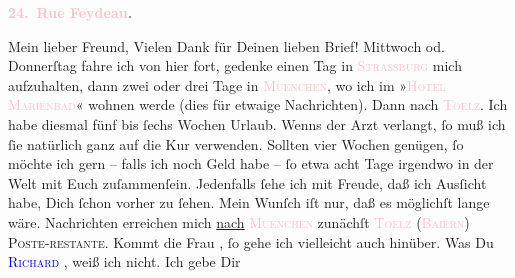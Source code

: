            \pstart
           \begin{otherlanguage}{french}\textcolor{gray}{\textbf{\textbf{\textcolor{pink}{24. Rue Feydeau}{}\ledrightnote{\textcolor{pink}{rue Feydeau}}.}}}\end{otherlanguage}\pend
           \pstart\center{}Mein lieber Freund,\pend\pstart
           Vielen Dank für Deinen lieben Brief! \pend
           \pstart
           Mittwoch od. Donnerſtag
               fahre ich von hier fort, gedenke einen Tag in \textsc{\textcolor{pink}{Strassburg}{}\ledrightnote{\textcolor{pink}{Straßburg}}} mich aufzuhalten, dann zwei oder drei Tage in \textsc{\textcolor{pink}{Muenchen}{}\ledrightnote{\textcolor{pink}{München}}}, wo ich im »\textsc{\textcolor{pink}{Hotel Marienbad}{}\ledrightnote{\textcolor{pink}{Hotel Marienbad}}}« wohnen werde (dies für etwaige Nachrichten). Dann nach \textsc{\textcolor{pink}{Toelz}{}\ledrightnote{\textcolor{pink}{Bad Tölz}}}. Ich habe diesmal {\pb}fünf bis ſechs Wochen
               Urlaub. Wenns der Arzt verlangt, ſo muß ich ſie natürlich ganz auf die Kur verwenden.
               Sollten vier Wochen genügen, ſo möchte ich gern – falls ich noch Geld habe – ſo etwa
               acht Tage irgendwo in der Welt mit Euch zuſammenſein. Jedenfalls ſehe ich mit Freude,
               daß ich Ausſicht habe, Dich ſchon vorher zu ſehen. Mein Wunſch iſt nur, daß es
               möglichſt lange wäre. Nachrichten erreichen mich {\pb}\uline{nach}{ }\textsc{\textcolor{pink}{Muenchen}{}\ledrightnote{\textcolor{pink}{München}}} zunächſt \textsc{\textcolor{pink}{Toelz}{}\ledrightnote{\textcolor{pink}{Bad Tölz}}} (\textsc{\textcolor{pink}{Baiern}{}\ledrightnote{\textcolor{pink}{Bayern}}}) \textsc{Poste-restante}. Kommt die Frau \label{K_L02742-1v}\label{K_L02742-1h}, ſo gehe ich vielleicht auch
               hinüber. Was Du \textsc{\textcolor{blue}{Richard}{}\ledrightnote{\textcolor{blue}{Richard Beer-Hofmann}}}{ }\label{K_L02742-2v}\label{K_L02742-2h}, weiß ich nicht. Ich gebe Dir
